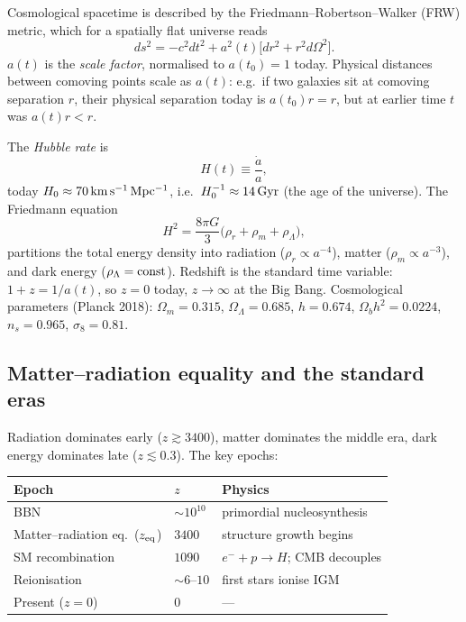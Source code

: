 \documentclass[12pt]{article}
\begin{document}
Cosmological spacetime is described by the Friedmann--Robertson--Walker
(FRW) metric, which for a spatially flat universe reads
%
\begin{equation}
  ds^2 = -c^2 dt^2 + a^2(t)\bigl[dr^2 + r^2 d\Omega^2\bigr].
\end{equation}
%
$a(t)$ is the \emph{scale factor}, normalised to $a(t_0) = 1$ today.
Physical distances between comoving points scale as $a(t)$: e.g.\ if
two galaxies sit at comoving separation $r$, their physical separation
today is $a(t_0)r = r$, but at earlier time $t$ was $a(t)r < r$.

The \emph{Hubble rate} is
%
\begin{equation}
  H(t) \equiv \frac{\dot a}{a},
\end{equation}
%
today $H_0 \approx 70\,{\rm km\,s^{-1}\,Mpc^{-1}}$, i.e.\ $H_0^{-1}
\approx 14\,{\rm Gyr}$ (the age of the universe).  The Friedmann
equation
%
\begin{equation}
  H^2 = \frac{8\pi G}{3}\bigl(\rho_r + \rho_m + \rho_\Lambda\bigr),
\end{equation}
%
partitions the total energy density into radiation ($\rho_r\propto
a^{-4}$), matter ($\rho_m\propto a^{-3}$), and dark energy ($\rho_\Lambda
= {\rm const}$).  Redshift is the standard time variable:
$1 + z = 1/a(t)$, so $z = 0$ today, $z \to \infty$ at the Big Bang.
Cosmological parameters (Planck 2018):
$\Omega_m = 0.315$, $\Omega_\Lambda = 0.685$, $h = 0.674$,
$\Omega_b h^2 = 0.0224$, $n_s = 0.965$, $\sigma_8 = 0.81$.

\subsection{Matter--radiation equality and the standard eras}

Radiation dominates early ($z\gtrsim 3400$), matter dominates the
middle era, dark energy dominates late ($z\lesssim 0.3$).  The key
epochs:
%
\begin{center}\begin{tabular}{lll}
\toprule
Epoch & $z$ & Physics \\
\midrule
BBN               & $\sim 10^{10}$ & primordial nucleosynthesis \\
Matter--radiation eq.\ ($z_{\rm eq}$) & $3400$ & structure growth begins \\
SM recombination & $1090$ & $e^-+p\to H$; CMB decouples \\
Reionisation      & $\sim 6$--$10$ & first stars ionise IGM \\
Present ($z=0$)   & $0$ & --- \\
\bottomrule
\end{tabular}\end{center}
\end{document}
